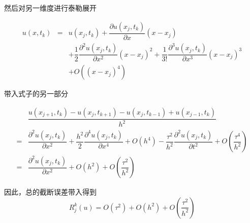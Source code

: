 \documentclass[9pt, a4paper]{article}
\begin{document}
然后对另一维度进行泰勒展开

\begin{spacing}{2.3}
\begin{equation}
	\begin{array}{rcl}
		u(x,t_k) & = & u(x_j,t_k) + \dfrac{\partial u(x_j, t_k)}{\partial x}(x-x_j)\\
			   	 &   & + \dfrac{1}{2}\dfrac{\partial^2 u(x_j,t_k)}{\partial x^2}(x-x_j)^2+\dfrac{1}{3!}\dfrac{\partial^3 u(x_j,t_k)}{\partial x^3}(x-x_j)^3\\
				 &   & + O\left((x-x_j)^4\right)
	\end{array}
\end{equation}
\end{spacing}

带入式子的另一部分
\begin{spacing}{2.3}
\begin{equation}
	\begin{array}{ll}
		& \dfrac{u(x_{j+1},t_k)-u(x_j,t_{k+1})-u(x_j,t_{k-1})+u(x_{j-1},t_{k})}{h^2}\\
		=& \dfrac{\partial^2u(x_j,t_k)}{\partial x^2}+\dfrac{h^2}{2}\dfrac{\partial^4u(x_j,t_k)}{\partial x^4}+O(h^4)-\dfrac{\tau^2}{h^2}\dfrac{\partial^2u(x_j,t_k)}{\partial t^2}+O(\dfrac{\tau^4}{h^2})\\
		=& \dfrac{\partial^2u(x_j,t_k)}{\partial x^2}+O(h^2)+O(\dfrac{\tau^2}{h^2}) 
	\end{array}
\end{equation}
\end{spacing}

因此，总的截断误差带入得到
\begin{equation}
	R_j^k(u)=O(\tau^2)+O(h^2)+O(\dfrac{\tau^2}{h^2})
\end{equation}
\end{document}
